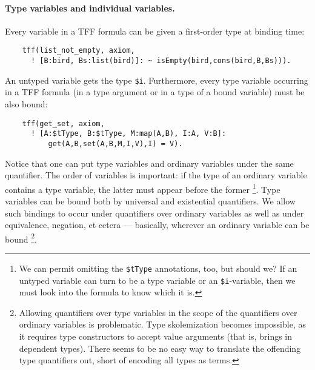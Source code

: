 \paragraph{Type variables and individual variables.}
Every variable in a TFF formula can be given a first-order type
at binding time:
\begin{verbatim}
    tff(list_not_empty, axiom,
      ! [B:bird, Bs:list(bird)]: ~ isEmpty(bird,cons(bird,B,Bs))).
\end{verbatim}
An untyped variable gets the type \verb+$i+.
Furthermore, every type variable occurring in a TFF formula
(in a type argument or in a type of a bound variable)
must be also bound:
\begin{verbatim}
    tff(get_set, axiom,
      ! [A:$tType, B:$tType, M:map(A,B), I:A, V:B]:
          get(A,B,set(A,B,M,I,V),I) = V).
\end{verbatim}
Notice that one can put type variables and ordinary variables
under the same quantifier. The order of variables is important:
if the type of an ordinary variable contains a type variable,
the latter must appear before the former%
\footnote{We can permit omitting the {\tt\$tType} annotations,
too, but should we? If an untyped variable can turn to be
a type variable or an {\tt\$i}-variable, then we must look
into the formula to know which it is.}.
Type variables can be bound both by universal and existential
quantifiers.
We allow such bindings to occur under quantifiers over ordinary
variables as well as under equivalence, negation, et cetera ---
basically, wherever an ordinary variable can be bound%
\footnote{Allowing quantifiers over type variables in the scope
of the quantifiers over ordinary variables is problematic.
Type skolemization becomes impossible, as it requires type
constructors to accept value arguments (that is, brings in
dependent types). There seems to be no easy way to translate
the offending type quantifiers out, short of encoding all
types as terms.}.

